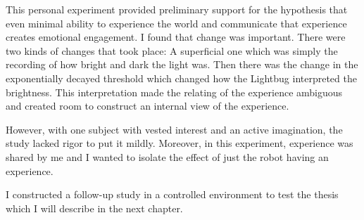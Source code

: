 This personal experiment provided preliminary support for the hypothesis that even minimal ability to experience the world and communicate that experience creates emotional engagement. I found that change was important. There were two kinds of changes that took place: A superficial one which was simply the recording of how bright and dark the light was. Then there was the change in the exponentially decayed threshold which changed how the Lightbug interpreted the brightness. This interpretation made the relating of the experience ambiguous and created room to construct an internal view of the experience.

However, with one subject with vested interest and an active imagination, the study lacked rigor to put it mildly. Moreover, in this experiment, experience was shared by me and I wanted to isolate the effect of just the robot having an experience. 

I constructed a follow-up study in a controlled environment to test the thesis which I will describe in the next chapter. 







